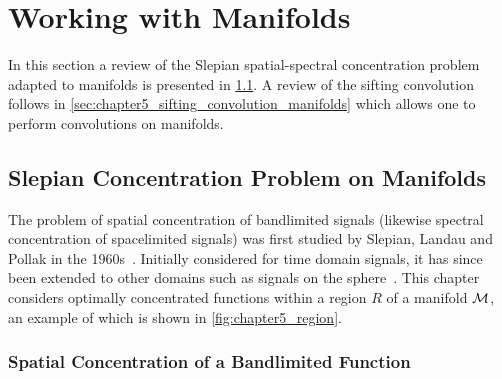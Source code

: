 \section{Working with Manifolds}\label{sec:chapter5_working_with_manifolds}

In this section a review of the Slepian spatial-spectral concentration problem adapted to manifolds is presented in \cref{sec:chapter5_slepian_concentration_problem_manifolds}.
A review of the sifting convolution follows in \cref{sec:chapter5_sifting_convolution_manifolds} which allows one to perform convolutions on manifolds.

\subsection{Slepian Concentration Problem on Manifolds}\label{sec:chapter5_slepian_concentration_problem_manifolds}

The problem of spatial concentration of bandlimited signals (likewise spectral concentration of spacelimited signals) was first studied by Slepian, Landau and Pollak in the 1960s~\cite{Slepian1961,Landau1961,Landau1962}.
Initially considered for time domain signals, it has since been extended to other domains such as signals on the sphere~\cite{Simons2006,Roddy2021a,Xu1983,Wieczorek2005}.
This chapter considers optimally concentrated functions within a region \(R\) of a manifold \(\mathcal{M}{}\), an example of which is shown in \cref{fig:chapter5_region}.



\subsubsection{Spatial Concentration of a Bandlimited Function}

